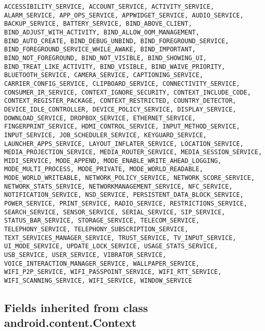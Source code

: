 \begin{lstlisting}
ACCESSIBILITY_SERVICE, ACCOUNT_SERVICE, ACTIVITY_SERVICE, ALARM_SERVICE, APP_OPS_SERVICE, APPWIDGET_SERVICE, AUDIO_SERVICE, BACKUP_SERVICE, BATTERY_SERVICE, BIND_ABOVE_CLIENT, BIND_ADJUST_WITH_ACTIVITY, BIND_ALLOW_OOM_MANAGEMENT, BIND_AUTO_CREATE, BIND_DEBUG_UNBIND, BIND_FOREGROUND_SERVICE, BIND_FOREGROUND_SERVICE_WHILE_AWAKE, BIND_IMPORTANT, BIND_NOT_FOREGROUND, BIND_NOT_VISIBLE, BIND_SHOWING_UI, BIND_TREAT_LIKE_ACTIVITY, BIND_VISIBLE, BIND_WAIVE_PRIORITY, BLUETOOTH_SERVICE, CAMERA_SERVICE, CAPTIONING_SERVICE, CARRIER_CONFIG_SERVICE, CLIPBOARD_SERVICE, CONNECTIVITY_SERVICE, CONSUMER_IR_SERVICE, CONTEXT_IGNORE_SECURITY, CONTEXT_INCLUDE_CODE, CONTEXT_REGISTER_PACKAGE, CONTEXT_RESTRICTED, COUNTRY_DETECTOR, DEVICE_IDLE_CONTROLLER, DEVICE_POLICY_SERVICE, DISPLAY_SERVICE, DOWNLOAD_SERVICE, DROPBOX_SERVICE, ETHERNET_SERVICE, FINGERPRINT_SERVICE, HDMI_CONTROL_SERVICE, INPUT_METHOD_SERVICE, INPUT_SERVICE, JOB_SCHEDULER_SERVICE, KEYGUARD_SERVICE, LAUNCHER_APPS_SERVICE, LAYOUT_INFLATER_SERVICE, LOCATION_SERVICE, MEDIA_PROJECTION_SERVICE, MEDIA_ROUTER_SERVICE, MEDIA_SESSION_SERVICE, MIDI_SERVICE, MODE_APPEND, MODE_ENABLE_WRITE_AHEAD_LOGGING, MODE_MULTI_PROCESS, MODE_PRIVATE, MODE_WORLD_READABLE, MODE_WORLD_WRITEABLE, NETWORK_POLICY_SERVICE, NETWORK_SCORE_SERVICE, NETWORK_STATS_SERVICE, NETWORKMANAGEMENT_SERVICE, NFC_SERVICE, NOTIFICATION_SERVICE, NSD_SERVICE, PERSISTENT_DATA_BLOCK_SERVICE, POWER_SERVICE, PRINT_SERVICE, RADIO_SERVICE, RESTRICTIONS_SERVICE, SEARCH_SERVICE, SENSOR_SERVICE, SERIAL_SERVICE, SIP_SERVICE, STATUS_BAR_SERVICE, STORAGE_SERVICE, TELECOM_SERVICE, TELEPHONY_SERVICE, TELEPHONY_SUBSCRIPTION_SERVICE, TEXT_SERVICES_MANAGER_SERVICE, TRUST_SERVICE, TV_INPUT_SERVICE, UI_MODE_SERVICE, UPDATE_LOCK_SERVICE, USAGE_STATS_SERVICE, USB_SERVICE, USER_SERVICE, VIBRATOR_SERVICE, VOICE_INTERACTION_MANAGER_SERVICE, WALLPAPER_SERVICE, WIFI_P2P_SERVICE, WIFI_PASSPOINT_SERVICE, WIFI_RTT_SERVICE, WIFI_SCANNING_SERVICE, WIFI_SERVICE, WINDOW_SERVICE
\end{lstlisting}

\subsection{Fields inherited from class android.content.Context}

